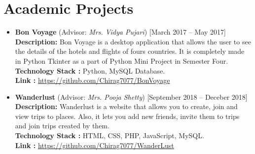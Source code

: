 \documentclass[11pt,a4paper]{moderncv}
\begin{document}
\section{Academic Projects}

\begin{itemize}	
	
	\item\textbf{Bon Voyage} (Advisor: \textit{Mrs. Vidya Pujari}) \hfill [March 2017 -- May 2017]\\
	\textbf{Description:}
	Bon Voyage is a desktop application that allows the user to see the details of the hotels and flights of fours countries. It is completely made in Python Tkinter as a part of Python Mini Project in Semester Four.
\textbf{Technology Stack :} Python, MySQL Database.\\
\textbf{Link :} \url{https://github.com/Chirag7077/BonVoyage}
		
	\item\textbf{Wanderlust} (Advisor: \textit{Mrs. Pooja Shetty}) \hfill [September 2018 -- Deceber 2018]\\
	\textbf{Description:}
	Wanderlust is a website that allows you to create, join and view trips to places. Also, it lets you add new friends, invite them to trips and join trips created by them.\\
\textbf{Technology Stack :} HTML, CSS, PHP, JavaScript, MySQL.\\
\textbf{Link :} \url{https://github.com/Chirag7077/WanderLust}
	
\end{itemize}

\end{document}
